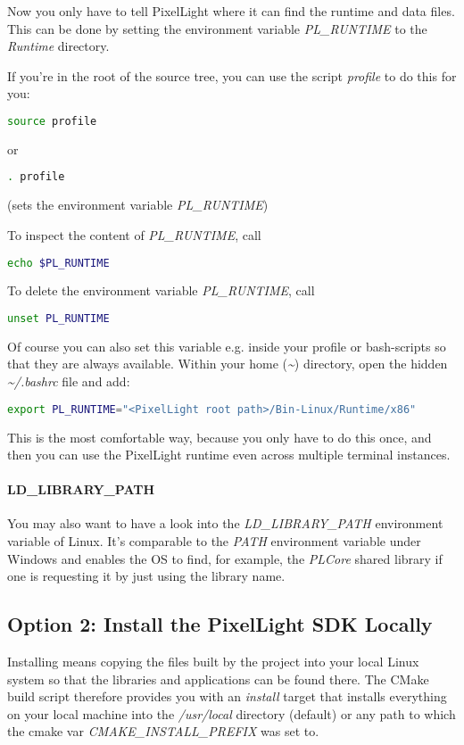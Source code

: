 Now you only have to tell PixelLight where it can find the runtime and data files. This can be done by setting the environment variable \emph{PL\_RUNTIME} to the \emph{Runtime} directory.

If you're in the root of the source tree, you can use the script \emph{profile} to do this for you:
\begin{lstlisting}[language=sh]
source profile
\end{lstlisting}
or
\begin{lstlisting}[language=sh]
. profile
\end{lstlisting}
(sets the environment variable \emph{PL\_RUNTIME})

To inspect the content of \emph{PL\_RUNTIME}, call
\begin{lstlisting}[language=sh]
echo $PL_RUNTIME
\end{lstlisting}

To delete the environment variable \emph{PL\_RUNTIME}, call
\begin{lstlisting}[language=sh]
unset PL_RUNTIME
\end{lstlisting}

Of course you can also set this variable e.g. inside your profile or bash-scripts so that they are always available. Within your home (\emph{\textasciitilde}) directory, open the hidden \emph{\textasciitilde /.bashrc} file and add:
\begin{lstlisting}[language=sh]
export PL_RUNTIME="<PixelLight root path>/Bin-Linux/Runtime/x86"
\end{lstlisting}
This is the most comfortable way, because you only have to do this once, and then you can use the PixelLight runtime even across multiple terminal instances.


\paragraph{LD\_LIBRARY\_PATH}
You may also want to have a look into the \emph{LD\_LIBRARY\_PATH} environment variable of Linux. It's comparable to the \emph{PATH} environment variable under Windows and enables the \ac{OS} to find, for example, the \emph{PLCore} shared library if one is requesting it by just using the library name.



\subsection{Option 2: Install the PixelLight \ac{SDK} Locally}
Installing means copying the files built by the project into your local Linux system so that the libraries and applications can be found there. The CMake build script therefore provides you with an \emph{install} target that installs everything on your local machine into the \emph{/usr/local} directory (default) or any path to which the cmake var \emph{CMAKE\_INSTALL\_PREFIX} was set to.

